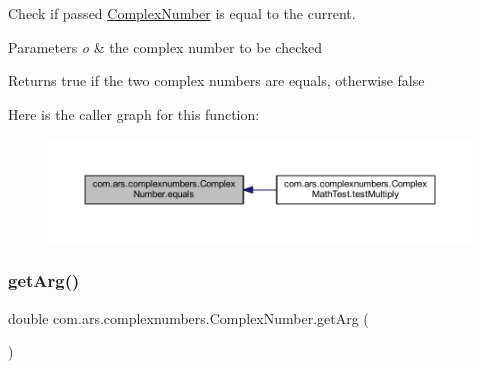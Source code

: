Check if passed {\ttfamily \hyperlink{classcom_1_1ars_1_1complexnumbers_1_1_complex_number}{Complex\+Number}} is equal to the current. 
\begin{DoxyParams}{Parameters}
{\em o} & the complex number to be checked \\
\hline
\end{DoxyParams}
\begin{DoxyReturn}{Returns}
true if the two complex numbers are equals, otherwise false 
\end{DoxyReturn}
Here is the caller graph for this function\+:\nopagebreak
\begin{figure}[H]
\begin{center}
\leavevmode
\includegraphics[width=350pt]{classcom_1_1ars_1_1complexnumbers_1_1_complex_number_a8dd0d197e07c92cb3f7e98697a18d96f_icgraph}
\end{center}
\end{figure}
\hypertarget{classcom_1_1ars_1_1complexnumbers_1_1_complex_number_a7cbe3a7d9d1e409b2c00cfd34e95b3e8}{}\label{classcom_1_1ars_1_1complexnumbers_1_1_complex_number_a7cbe3a7d9d1e409b2c00cfd34e95b3e8} 
\subsubsection{\texorpdfstring{get\+Arg()}{getArg()}}
{\footnotesize\ttfamily double com.\+ars.\+complexnumbers.\+Complex\+Number.\+get\+Arg (\begin{DoxyParamCaption}{ }\end{DoxyParamCaption})}

